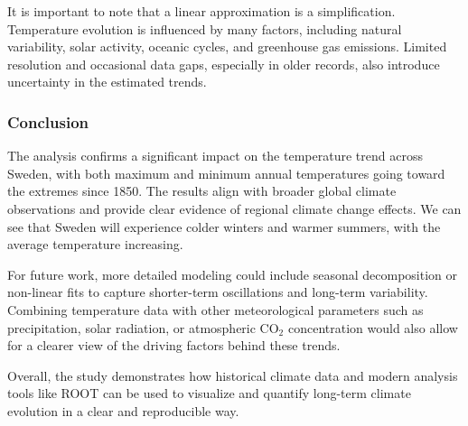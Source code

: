 It is important to note that a linear approximation is a simplification. Temperature evolution is influenced by many factors, including natural variability, solar activity, oceanic cycles, and greenhouse gas emissions. Limited resolution and occasional data gaps, especially in older records, also introduce uncertainty in the estimated trends.

\subsubsection{Conclusion}

The analysis confirms a significant impact on the temperature trend across Sweden, with both maximum and minimum annual temperatures going toward the extremes since 1850. The results align with broader global climate observations and provide clear evidence of regional climate change effects. We can see that Sweden will experience colder winters and warmer summers, with the average temperature increasing.

For future work, more detailed modeling could include seasonal decomposition or non-linear fits to capture shorter-term oscillations and long-term variability. Combining temperature data with other meteorological parameters such as precipitation, solar radiation, or atmospheric CO$_2$ concentration would also allow for a clearer view of the driving factors behind these trends.

Overall, the study demonstrates how historical climate data and modern analysis tools like ROOT can be used to visualize and quantify long-term climate evolution in a clear and reproducible way.
